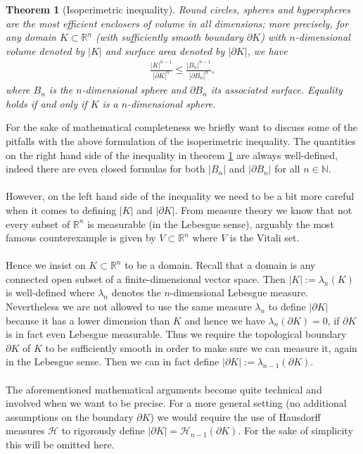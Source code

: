 \documentclass[12pt, a4paper, titlepage]{article}
\newtheorem{thm}{Theorem}
\begin{document}
\newpage 
\begin{thm}[Isoperimetric inequality] \label{T1} Round circles, spheres and hyperspheres are the most efficient enclosers of volume in all dimensions; more precisely, for any domain $K \subset \mathbb{R}^n$ (with sufficiently smooth boundary $\partial K$) with $n$-dimensional volume denoted by $|K|$ and surface area denoted by $| \partial K|$, we have
\begin{align*}
\frac{|K|^{n-1}}{| \partial K|^n} \leq \frac{|B_n|^{n-1}}{| \partial B_n|^n},
\end{align*}
where $B_n$ is the $n$-dimensional sphere and $\partial B_n$ its associated surface. Equality holds if and only if $K$ is a $n$-dimensional sphere.
\end{thm}
For the sake of mathematical completeness we briefly want to discuss some of the pitfalls with the above formulation of the isoperimetric inequality. The quantities on the right hand side of the inequality in theorem \ref{T1} are always well-defined, indeed there are even closed formulas for both $|B_n|$ and $| \partial B_n|$ for all $n \in \mathbb{N}$.
\\
\\
However, on the left hand side of the inequality we need to be a bit more careful when it comes to defining $|K|$ and $| \partial K|$. From measure theory we know that not every subset of $\mathbb{R}^n$ is measurable (in the Lebesgue sense), arguably the most famous counterexample is given by $V \subset \mathbb{R}^n$ where $V$ is the Vitali set. 
\\\\
Hence we insist on $K \subset \mathbb{R}^n$ to be a domain. Recall that  a domain is any connected open subset of a finite-dimensional vector space. Then $|K|:= \lambda_n(K)$ is well-defined where $\lambda_n$ denotes the $n$-dimensional Lebesgue measure. Nevertheless we are not allowed to use the same measure $\lambda_n$ to define $| \partial K|$ because it has a lower dimension than $K$ and hence we have $\lambda_n( \partial K) = 0$, if $\partial K$ is in fact even Lebesgue measurable. Thus we require the topological boundary $\partial K$ of $K$ to be sufficiently smooth in order to make sure we can measure it, again in the Lebesgue sense. Then we can in fact define $| \partial K| := \lambda_{n-1}( \partial K)$. 
\\\\
The aforementioned mathematical arguments become quite technical and involved when we want to be precise. For a more general setting (no additional assumptions on the boundary $\partial K$) we would require the use of Hausdorff measures $\mathcal{H}$ to rigorously define $| \partial K| = \mathcal{H}_{n-1}( \partial K)$. For the sake of simplicity this will be omitted here. 
\end{document}
